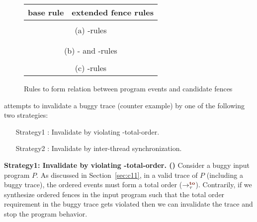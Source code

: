 \begin{figure}[t]
	\begin{tabular}{|c||c|c|c|}
		\multicolumn{1}{c}{base rule} & 
		\multicolumn{3}{c}{extended fence rules} \\\hline
		
		\resizebox{0.24\textwidth}{!}{} &
		\resizebox{0.24\textwidth}{!}{} &
		\resizebox{0.24\textwidth}{!}{} &
		\resizebox{0.24\textwidth}{!}{} \\
		\hline
		\multicolumn{4}{c}{(a) \lso-rules} \\
		\hline
		
		\resizebox{0.24\textwidth}{!}{} &
		\resizebox{0.24\textwidth}{!}{} &
		\resizebox{0.24\textwidth}{!}{} &
		\resizebox{0.24\textwidth}{!}{} \\
		
		\resizebox{0.24\textwidth}{!}{} &
		\resizebox{0.24\textwidth}{!}{} &&\\
		\hline
		\multicolumn{4}{c}{(b) \lsw- and \ldob-rules} \\
		\hline
		
		\resizebox{0.24\textwidth}{!}{} &
		\resizebox{0.24\textwidth}{!}{} & 
		\resizebox{0.24\textwidth}{!}{} &
		\resizebox{0.24\textwidth}{!}{} \\
		\hline
		\multicolumn{4}{c}{(c) \lws-rules} \\	
	\end{tabular}
	\caption{Rules to form relation between program events and 
		candidate fences}
	\label{fig:so rules}
\end{figure}

\ourtechnique attempts to invalidate a buggy trace (\aka counter
example) by one of the following two strategies:
\begin{itemize}[label=strategy1,align=left,leftmargin=*]
	\item [Strategy1]:
		Invalidate by violating \sc-total-order.
	\item [Strategy2]:
		Invalidate by inter-thread synchronization.
\end{itemize}

\noindent
{\bf Strategy1: Invalidate by violating \sc-total-order. 
	(\stfence)}\newline
Consider a buggy input program $P$.
%
As discussed in Section~\ref{sec:c11}, in a valid trace of $P$ 
(including a buggy trace), 
the \sc ordered events must form a total order ($\setTO$).
%
Contrarily, if we synthesize \sc ordered fences in the input program 
such that the total order requirement in the buggy trace gets violated 
then we can invalidate the trace and stop the program behavior.

